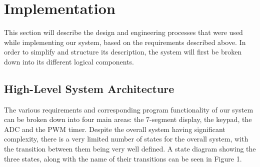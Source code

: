 \section{Implementation}

This section will describe the design and engineering processes that were used while implementing our system, based on the requirements described above. In order to simplify and structure its description, the system will first be broken down into its different logical components.


\subsection{High-Level System Architecture}
The various requirements and corresponding program functionality of our system can be broken down into four main areas: the 7-segment display, the keypad, the ADC and the PWM timer. Despite the overall system having significant complexity, there is a very limited number of states for the overall system, with the transition between them being very well defined. A state diagram showing the three states, along with the name of their transitions can be seen in Figure 1.





